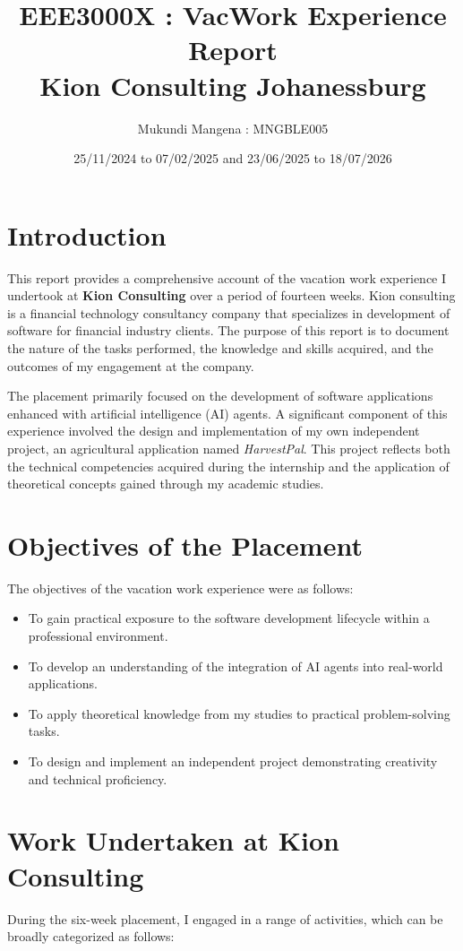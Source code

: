 \documentclass[12pt,a4paper]{report}
\title{\textbf{EEE3000X : VacWork Experience Report} \\[1em]
	\large Kion Consulting Johanessburg}
\author{Mukundi Mangena : MNGBLE005}
\date{25/11/2024 to 07/02/2025 and 23/06/2025 to 18/07/2026 }
\begin{document}
	
	\maketitle
	
	\section*{Introduction}
	This report provides a comprehensive account of the vacation work experience I undertook at \textbf{Kion Consulting} over a period of fourteen weeks. Kion consulting is a financial technology consultancy company that specializes in development of software for financial industry clients. The purpose of this report is to document the nature of the tasks performed, the knowledge and skills acquired, and the outcomes of my engagement at the company.
	
	The placement primarily focused on the development of software applications enhanced with artificial intelligence (AI) agents. A significant component of this experience involved the design and implementation of my own independent project, an agricultural application named \textit{HarvestPal}. This project reflects both the technical competencies acquired during the internship and the application of theoretical concepts gained through my academic studies.
	
	\section*{Objectives of the Placement}
	The objectives of the vacation work experience were as follows:
	\begin{itemize}
		\item To gain practical exposure to the software development lifecycle within a professional environment.
		\item To develop an understanding of the integration of AI agents into real-world applications.
		\item To apply theoretical knowledge from my studies to practical problem-solving tasks.
		\item To design and implement an independent project demonstrating creativity and technical proficiency.
	\end{itemize}
	
	\section{Work Undertaken at Kion Consulting}
	During the six-week placement, I engaged in a range of activities, which can be broadly categorized as follows:
	
\end{document}
